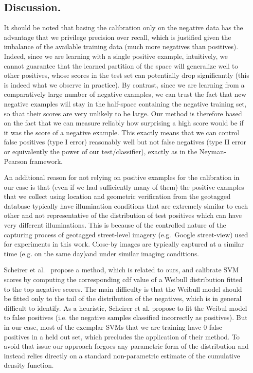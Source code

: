    \subsection{Discussion.}
      It should be noted that basing the calibration only on the negative data has the advantage that we privilege precision over recall, which is justified given the imbalance of the available training data (much more negatives than positives).
      Indeed, since we are learning with a single positive example, intuitively, we cannot guarantee that the learned partition of the space will generalize well to other positives, whose scores in the test set can potentially drop significantly (this is indeed what we observe in practice). By contrast, since we are learning from a comparatively large number of negative examples, we can trust the fact that new negative examples will stay in the half-space containing the negative training set, so that their scores are very unlikely to be large. Our method is therefore based on the fact that we can measure reliably how surprising a high score would be if it was the score of a negative example. This exactly means that we can control false positives (type I error) reasonably well but not false negatives (type II error or equivalently the power of our test/classifier), exactly as in the Neyman-Pearson framework.

      An additional reason for not relying on positive examples for the calibration in our case is that (even if we had sufficiently many of them) the positive examples that we collect using location and geometric verification from the geotagged database typically have illumination conditions that are extremely similar to each other and not representative of the distribution of test positives which can have very different illuminations. This is because of the controlled nature of the capturing process of geotagged street-level imagery (e.g.\ Google street-view) used for experiments in this work. Close-by images are typically captured at a similar time (e.g. on the same day)and under similar imaging conditions.


      Scheirer et al.~\cite{Scheirer12} propose a method, which is related to ours, and calibrate SVM scores by computing the corresponding cdf value of a Weibull distribution fitted to the top negative scores. The main difficulty is that the Weibull model should be fitted only to the tail of the distribution of the negatives, which is in general difficult to identify. As a heuristic, Scheirer et al. propose to fit the Weibul model to false positives (i.e. the negative samples classified incorrectly as positives). But in our case, most of the exemplar SVMs that we are training have $0$ false positives in a held out set, which precludes the application of their method. To avoid that issue our approach forgoes any parametric form of the distribution and instead relies directly on a standard non-parametric estimate of the cumulative density function.

